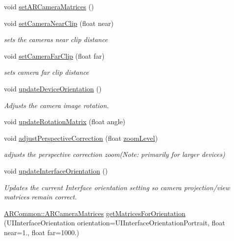 \begin{DoxyCompactItemize}
void \hyperlink{class_a_r_core_1_1_a_r_cam_ac554b8254ea4a22f122f25542694dafa}{set\+A\+R\+Camera\+Matrices} ()
\item 
void \hyperlink{class_a_r_core_1_1_a_r_cam_a040d67ba6abb95e914760ca6e64ac664}{set\+Camera\+Near\+Clip} (float near)
\begin{DoxyCompactList}\small\item\em sets the camera\textquotesingle{}s near clip distance \end{DoxyCompactList}\item 
void \hyperlink{class_a_r_core_1_1_a_r_cam_aa29191b58c0e6613850916526c6ab380}{set\+Camera\+Far\+Clip} (float far)
\begin{DoxyCompactList}\small\item\em sets camera far clip distance \end{DoxyCompactList}\item 
void \hyperlink{class_a_r_core_1_1_a_r_cam_a0c910d5c7f637ce2820132255dfb67f7}{update\+Device\+Orientation} ()
\begin{DoxyCompactList}\small\item\em Adjusts the camera image rotation. \end{DoxyCompactList}\item 
void \hyperlink{class_a_r_core_1_1_a_r_cam_a1813b2b0f2665741173228ffff518d67}{update\+Rotation\+Matrix} (float angle)
\item 
void \hyperlink{class_a_r_core_1_1_a_r_cam_ae2ecd3007e6684d1686c89d2ac3e7020}{adjust\+Perspective\+Correction} (float \hyperlink{class_a_r_core_1_1_a_r_cam_ac17d3b7fd12f51b2c54b7241efd36cd4}{zoom\+Level})
\begin{DoxyCompactList}\small\item\em adjusts the perspective correction zoom(\+Note\+: primarily for larger devices) \end{DoxyCompactList}\item 
void \hyperlink{class_a_r_core_1_1_a_r_cam_ac649b1e884931f123afd4dcecc1e3e6c}{update\+Interface\+Orientation} ()
\begin{DoxyCompactList}\small\item\em Updates the current Interface orientation setting so camera projection/view matrices remain correct. \end{DoxyCompactList}\item 
\hyperlink{struct_a_r_common_1_1_a_r_camera_matrices}{A\+R\+Common\+::\+A\+R\+Camera\+Matrices} \hyperlink{class_a_r_core_1_1_a_r_cam_a0061e3c56e3d30e6fec64235d9397809}{get\+Matrices\+For\+Orientation} (U\+I\+Interface\+Orientation orientation=U\+I\+Interface\+Orientation\+Portrait, float near=1., float far=1000.)

\end{DoxyCompactItemize}
